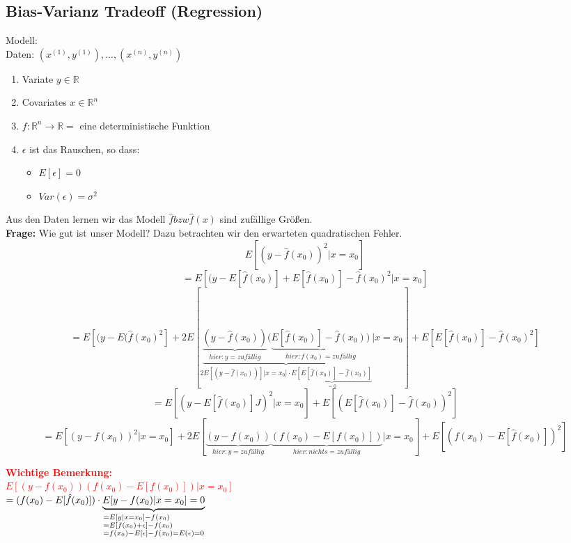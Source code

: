 \subsection*{Bias-Varianz Tradeoff (Regression)}
Modell: \\
Daten: $(x^{(1)},y^{(1)}),...,(x^{(n)},y^{(n)})$\\
\begin{enumerate}
\item Variate   $y \in \mathbb{R}$
\item Covariates    $x \in \mathbb{R}^n$
\item $f: \mathbb{R}^n \rightarrow \mathbb{R} =$ eine deterministische Funktion
\item $\epsilon$ ist das Rauschen, so dass:
\begin{itemize}
\item $E[\epsilon] = 0$
\item $Var(\epsilon) = \sigma^2$
\end{itemize}
\end{enumerate}
Aus den Daten lernen wir das Modell $\hat{f} bzw \hat{f}(x)$ sind zufällige Größen.\\
\textbf{Frage:} Wie gut ist unser Modell? Dazu betrachten wir den erwarteten quadratischen Fehler.
$$E[(y-\hat{f}(x_0))^2 | x = x_0] $$
$$= E[(y-E[\hat{f}(x_0)] + E[\hat{f}(x_0)] - \hat{f}(x_0)^2 | x = x_0] $$
$$= E[(y-E(\hat{f}(x_0)^2] + 2E[
\underbrace{
\underbrace{(y-\hat{f}(x_0))}_{hier: y = zufällig}(\underbrace{E[\hat{f}(x_0)]-\hat{f}(x_0))}_{hier: f(x_0) = zufällig}}_{2E[(y-\hat{f}(x_0))] | x = x_0] \cdot \underbrace{E[E[\hat{f}(x_0)]-\hat{f}(x_0)]}_{=0}} | x = x_0] + E[E[\hat{f}(x_0)]-\hat{f}(x_0)^2]$$
$$= E[(y-E[\hat{f}(x_0)]J)^2  | x = x_0] + E[(E[\hat{f}(x_0)] - \hat{f}(x_0))^2]$$
$$= E[(y-f(x_0))^2 | x=x_0] + 2E[\underbrace{(y-f(x_0))}_{hier: y = zufällig}\underbrace{(f(x_0)-E[f(x_0)])}_{hier: nichts = zufällig} | x = x_0] +  E[(f(x_0)-E[\hat{f}(x_0)])^2]$$

\textcolor{red}{
\textbf{Wichtige Bemerkung:}\\
$E[(y-f(x_0))(f(x_0) - E[f(x_0)]) | x = x_0]$\\
$= (f(x_0) - E[\hat{f}(x_0)]) \cdot \underbrace{E[y - f(x_0) | x = x_0] = 0}_{
\begin{subarray}{l} 
=E[y | x = x_0] - f(x_0)\\
= E[f(x_0) + \epsilon] - f(x_0)\\
=f(x_0) - E[\epsilon] - f(x_0) = E(\epsilon) = 0
\end{subarray}
} $
}

